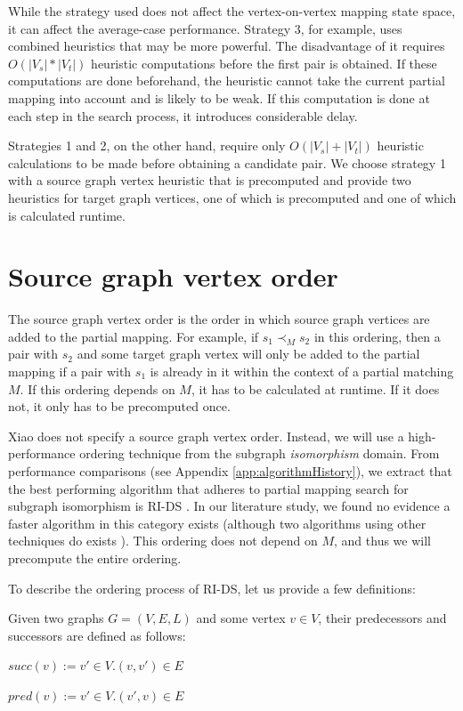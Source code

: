While the strategy used does not affect the vertex-on-vertex mapping state space, it can affect the average-case performance. Strategy 3, for example, uses combined heuristics that may be more powerful. The disadvantage of it requires $O(|V_s|*|V_t|)$ heuristic computations before the first pair is obtained. If these computations are done beforehand, the heuristic cannot take the current partial mapping into account and is likely to be weak. If this computation is done at each step in the search process, it introduces considerable delay.

Strategies 1 and 2, on the other hand, require only $O(|V_s|+|V_t|)$ heuristic calculations to be made before obtaining a candidate pair. We choose strategy 1 with a source graph vertex heuristic that is precomputed and provide two heuristics for target graph vertices, one of which is precomputed and one of which is calculated runtime.

\section{Source graph vertex order}
\label{sec:sourceOrder}
The source graph vertex order is the order in which source graph vertices are added to the partial mapping. For example, if $s_1 \prec_M s_2$ in this ordering, then a pair with $s_2$ and some target graph vertex will only be added to the partial mapping if a pair with $s_1$ is already in it within the context of a partial matching $M$. If this ordering depends on $M$, it has to be calculated at runtime. If it does not, it only has to be precomputed once.

Xiao does not specify a source graph vertex order. Instead, we will use a high-performance ordering technique from the subgraph \textit{isomorphism} domain. From performance comparisons (see Appendix \ref{app:algorithmHistory}), we extract that the best performing algorithm that adheres to partial mapping search for subgraph isomorphism is RI-DS \cite{RIalgorithm}. In our literature study, we found no evidence a faster algorithm in this category exists (although two algorithms using other techniques do exists \cite{Bonnici2019, Ma2019}). This ordering does not depend on $M$, and thus we will precompute the entire ordering.

To describe the ordering process of RI-DS, let us provide a few definitions:

\begin{defn}
Given two graphs $G=(V, E, L)$ and some vertex $v \in V$, their predecessors and successors are defined as follows:

$\mathit{succ}(v) := {v' \in V . (v, v') \in E}$

$\mathit{pred}(v) := {v' \in V . (v', v) \in E}$
 
\end{defn}

